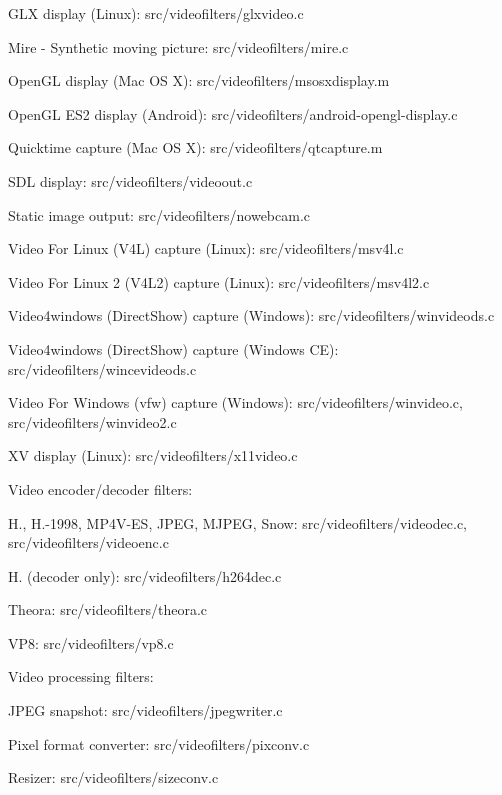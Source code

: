 \begin{DoxyItemize}
\begin{DoxyItemize}
\begin{DoxyItemize}
\item G\+LX display (Linux)\+: src/videofilters/glxvideo.\+c
\item Mire -\/ Synthetic moving picture\+: src/videofilters/mire.\+c
\item Open\+GL display (Mac OS X)\+: src/videofilters/msosxdisplay.\+m
\item Open\+GL E\+S2 display (Android)\+: src/videofilters/android-\/opengl-\/display.\+c
\item Quicktime capture (Mac OS X)\+: src/videofilters/qtcapture.\+m
\item S\+DL display\+: src/videofilters/videoout.\+c
\item Static image output\+: src/videofilters/nowebcam.\+c
\item Video For Linux (V4L) capture (Linux)\+: src/videofilters/msv4l.\+c
\item Video For Linux 2 (V4\+L2) capture (Linux)\+: src/videofilters/msv4l2.\+c
\item Video4windows (Direct\+Show) capture (Windows)\+: src/videofilters/winvideods.\+c
\item Video4windows (Direct\+Show) capture (Windows CE)\+: src/videofilters/wincevideods.\+c
\item Video For Windows (vfw) capture (Windows)\+: src/videofilters/winvideo.\+c, src/videofilters/winvideo2.\+c
\item XV display (Linux)\+: src/videofilters/x11video.\+c
\end{DoxyItemize}
\item Video encoder/decoder filters\+:
\begin{DoxyItemize}
\item H., H.-\/1998, M\+P4\+V-\/\+ES, J\+P\+EG, M\+J\+P\+EG, Snow\+: src/videofilters/videodec.\+c, src/videofilters/videoenc.\+c
\item H. (decoder only)\+: src/videofilters/h264dec.\+c
\item Theora\+: src/videofilters/theora.\+c
\item V\+P8\+: src/videofilters/vp8.\+c
\end{DoxyItemize}
\item Video processing filters\+:
\begin{DoxyItemize}
\item J\+P\+EG snapshot\+: src/videofilters/jpegwriter.\+c
\item Pixel format converter\+: src/videofilters/pixconv.\+c
\item Resizer\+: src/videofilters/sizeconv.\+c

\end{DoxyItemize}
\end{DoxyItemize}
\end{DoxyItemize}

